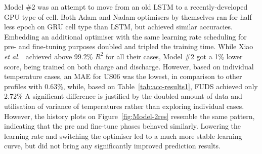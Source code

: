 %
%
Model \#2 was an attempt to move from an old LSTM to a recently-developed GPU type of cell.
Both Adam and Nadam optimisers by themselves ran for half less epoch on GRU cell type than LSTM, but achieved similar accuracies.
Embedding an additional optimiser with the same learning rate scheduling for pre- and fine-tuning purposes doubled and tripled the training time.
While Xiao \textit{et al.}~\cite{xiao_accurate_2019} achieved above 99.2\% $R^2$ for all their cases, Model \#2 got a 1\% lower score, being trained on both charge and discharge.
However, based on individual temperature cases, an MAE for US06 was the lowest, in comparison to other profiles with 0.63\%, while, based on Table~\ref{tab:acc-results1}, FUDS achieved only 2.72\%
A significant difference is justified by the doubled amount of data and utilisation of variance of temperatures rather than exploring individual cases.
However, the history plots on Figure~\ref{fig:Model-2res} resemble the same pattern, indicating that the pre and fine-tune phases behaved similarly.
Lowering the learning rate and switching the optimiser led to a much more stable learning curve, but did not bring any significantly improved prediction results.

